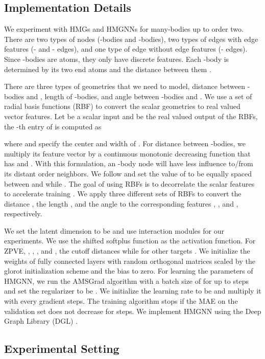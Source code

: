 \documentclass[conference]{IEEEtran}
\begin{document}
\subsection{Implementation Details} \label{Sec:implement}

We experiment with HMGs and HMGNNs for many-bodies up to order two. There are two types of nodes (-bodies and -bodies), two types of edges with edge features (- and - edges), and one type of edge without edge features (- edges). Since -bodies are atoms, they only have discrete features. Each -body  is determined by its two end atoms and the distance between them . 

There are three types of geometries that we need to model, distance  between -bodies  and , length  of -bodies, and angle  between -bodies  and . We use a set of  radial basis functions (RBF) to convert the scalar geometries to real valued vector features. Let  be a scalar input and  be the real valued output of the RBFs, the -th entry of  is computed as

where  and  specify the center and width of . For distance  between -bodies, we multiply its feature vector by a continuous monotonic decreasing function  that has  and . With this formulation, an -body node will have less influence to/from its distant order  neighbors. We follow \cite{unke2019physnet} and set the value of  to be equally spaced between  and  while . The goal of using RBFs is to decorrelate the scalar features to accelerate training \cite{SchNet-1}. We apply three different sets of RBFs to convert the distance , the length , and the angle  to the corresponding features , , and , respectively. 

We set the latent dimension to be  and use  interaction modules for our experiments. We use the shifted softplus function as the activation function. For ZPVE, , , ,  and , the cutoff distances  while for other targets . We initialize the weights of fully connected layers with random orthogonal matrices scaled by the glorot initialization scheme \cite{glorot} and the bias to zero. For learning the parameters of HMGNN, we run the AMSGrad algorithm \cite{amsgrad} with a batch size of  for up to  steps and set the  regularizer  to be . We initialize the learning rate to be  and multiply it with  every  gradient steps. The training algorithm stops if the MAE on the validation set does not decrease for  steps. We implement HMGNN using the Deep Graph Library (DGL) \cite{dgl-1, dgl-2}. 

\subsection{Experimental Setting}
\end{document}
